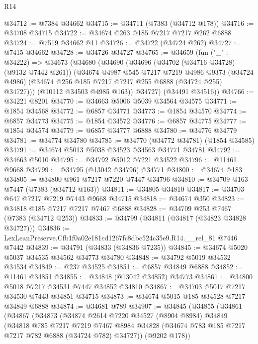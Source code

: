 \begin{lexlean}{R14}
\begin{coremodule}
@34712 := @7384 @34662
@34715 := @34711 (@7383 (@34712 @178))
@34716 := @34708 @34715
@34722 := @34674 @263 @185 @7217 @7217 @262 @6888
@34724 := @7519 @34662 @11
@34726 := @34722 (@34724 @262)
@34727 := @7415 @34662
@34728 := @34726 @34727
@34765 := @34659
    (fun ("_" : @34222) =>
    @34673
      (@34680
        (@34690
          (@34696
            (@34702 (@34716 @34728) (@9132 @7442 @261))
            (@34674
              @4987
              @545
              @7217
              @7219
              @4986
              @9373
              (@34724 @4986)
              (@34674 @256 @185 @7217 @7217 @255 @6888 (@34724 @255) @34727)))
          (@10112 @34503 @4985 @163))
        @34727)
      (@34491 @34516))
@34766 := @34221 @8201
@34770 := @34663 @5006 @5039 @34564 @34575
@34771 := @1854 @34568
@34772 := @6857 @34771
@34773 := @1854 @34570
@34774 := @6857 @34773
@34775 := @1854 @34572
@34776 := @6857 @34775
@34777 := @1854 @34574
@34779 := @6857 @34777 @6888
@34780 := @34776 @34779
@34781 := @34774 @34780
@34785 := @34770 (@34772 @34781) (@1854 @34585)
@34791 := @34674 @5013 @5038 @34523 @34563 @34771 @34781
@34792 := @34663 @5010
@34795 := @34792 @5012 @7221 @34522
@34796 := @11461 @9668
@34799 := @34795 (@13042 @34796) @34771
@34800 := @34674 @183
@34805 := @34800 @961 @7217 @7220 @7447 @34796
@34810 := @34709 @163 @7447 (@7383 (@34712 @163))
@34811 := @34805 @34810
@34817 := @34703 @647 @7217 @7219 @7443 @9668 @34715
@34818 := @34674 @350
@34823 := @34818 @185 @7217 @7217 @7467 @6888
@34828 := @34709 @253 @7467 (@7383 (@34712 @253))
@34833 := @34799 (@34811 (@34817 (@34823 @34828 @34727)))
@34836 := LexLeanPreserve.Cfb1f0a02e181ed1267fc8dbc524c35e9.R14.__rel_81 @7446 @7442
@34839 := @34791 (@34833 (@34836 @7235))
@34845 := @34674 @5020 @5037 @34535 @34562 @34773 @34780
@34848 := @34792 @5019 @34532 @34534
@34849 := @237 @34525
@34851 := @6857 @34849 @6888
@34852 := @11461 @34851
@34855 := @34848 (@13042 @34852) @34773
@34861 := @34800 @5018 @7217 @34531 @7447 @34852 @34810
@34867 := @34703 @5017 @7217 @34530 @7443 @34851 @34715
@34873 := @34674 @5015 @185 @34528 @7217 @34849 @6888
@34874 := @34681 @789
@34907 := @34845
    (@34855
      (@34861
        (@34867
          (@34873
            (@34874
              @2614
              @7220
              @34527
              (@8904 @8984)
              @34849
              (@34818
                @785
                @7217
                @7219
                @7467
                @8984
                @34828
                (@34674 @783 @185 @7217 @7217 @782 @6888 (@34724 @782) @34727))
              (@9202 @178))

\end{coremodule}
\end{lexlean}

